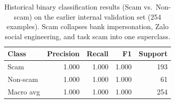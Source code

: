 \begin{table}[H]
\centering
\setlength{\tabcolsep}{10pt}
\renewcommand{\arraystretch}{1.3}
\begin{tabular}{lrrrr}
\toprule
\textbf{Class} & \textbf{Precision} & \textbf{Recall} & \textbf{F1} & \textbf{Support} \\
\midrule
Scam     & 1.000 & 1.000 & 1.000 & 193 \\
Non-scam & 1.000 & 1.000 & 1.000 &  61 \\
\midrule
Macro avg & 1.000 & 1.000 & 1.000 & 254 \\
\bottomrule
\end{tabular}
\caption{Historical binary classification results (Scam vs.\ Non-scam) on the earlier internal validation set (254 examples). Scam collapses bank impersonation, Zalo social engineering, and task scam into one superclass.}
\label{tab:binary-metrics}
\end{table}
